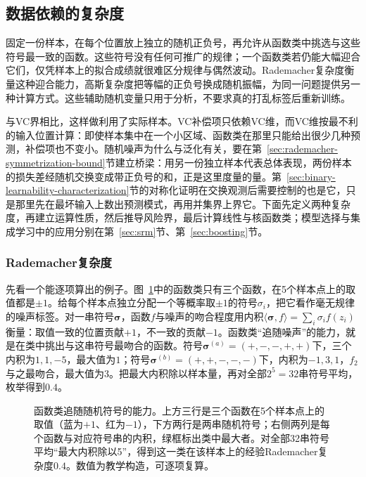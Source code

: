 \subsection{数据依赖的复杂度}
\label{sec:rademacher-complexity}

固定一份样本，在每个位置放上独立的随机正负号，再允许从函数类中挑选与这些符号最一致的函数。这些符号没有任何可推广的规律；一个函数类若仍能大幅迎合它们，仅凭样本上的拟合成绩就很难区分规律与偶然波动。Rademacher复杂度衡量这种迎合能力，高斯复杂度把等幅的正负号换成随机振幅，为同一问题提供另一种计算方式。这些辅助随机变量只用于分析，不要求真的打乱标签后重新训练。

与VC界相比，这样做利用了实际样本。VC补偿项只依赖VC维，而VC维按最不利的输入位置计算：即使样本集中在一个小区域、函数类在那里只能给出很少几种预测，补偿项也不变小。随机噪声为什么与泛化有关，要在第~\ref{sec:rademacher-symmetrization-bound}节建立桥梁：用另一份独立样本代表总体表现，两份样本的损失差经随机交换变成带正负号的和，正是这里度量的量。第~\ref{sec:binary-learnability-characterization}节的对称化证明在交换观测后需要控制的也是它，只是那里先在最坏输入上数出预测模式，再用并集界上界它。下面先定义两种复杂度，再建立运算性质，然后推导风险界，最后计算线性与核函数类；模型选择与集成学习中的应用分别在第~\ref{sec:srm}节、第~\ref{sec:boosting}节。

\subsubsection{Rademacher复杂度}

先看一个能逐项算出的例子。图~\ref{fig:lt7a-rademacher-noise-fit}中的函数类只有三个函数，在5个样本点上的取值都是$\pm1$。给每个样本点独立分配一个等概率取$\pm1$的符号$\sigma_i$，把它看作毫无规律的噪声标签。对一串符号$\bm\sigma$，函数$f$与噪声的吻合程度用内积$\langle\bm\sigma,f\rangle=\sum_i\sigma_if(z_i)$衡量：取值一致的位置贡献$+1$，不一致的贡献$-1$。函数类“追随噪声”的能力，就是在类中挑出与这串符号最吻合的函数。符号$\bm\sigma^{(a)}=(+,-,-,+,+)$下，三个内积为$1,1,-5$，最大值为$1$；符号$\bm\sigma^{(b)}=(+,+,-,-,-)$下，内积为$-1,3,1$，$f_2$与之最吻合，最大值为$3$。把最大内积除以样本量，再对全部$2^5=32$串符号平均，枚举得到$0.4$。

\begin{figure}[htbp]
 \centering
 
 \caption{函数类追随随机符号的能力。上方三行是三个函数在5个样本点上的取值（蓝为$+1$、红为$-1$），下方两行是两串随机符号；右侧两列是每个函数与对应符号串的内积，绿框标出类中最大者。对全部32串符号平均“最大内积除以5”，得到这一类在该样本上的经验Rademacher复杂度$0.4$。数值为教学构造，可逐项复算。}
 \label{fig:lt7a-rademacher-noise-fit}
\end{figure}

